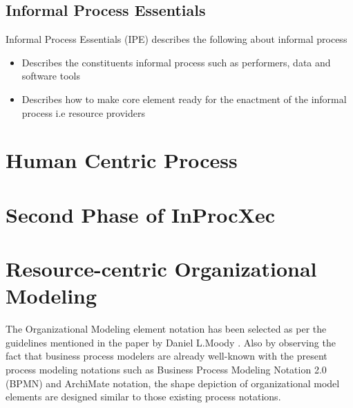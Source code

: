 \subsection{Informal Process Essentials}
\label{sec:informalprocessessentials}
Informal Process Essentials (IPE) describes the following about informal process \cite{Sungur2014} 

\begin{itemize}
	\item Describes the constituents informal process such as performers, data and software tools
	\item Describes how to make core element ready for the enactment of the informal process i.e resource providers
\end{itemize}




\section{Human Centric Process}
\label{sec:humancentric}



\section{Second Phase of InProcXec}
\label{sec:inproxec}





\section{Resource-centric Organizational Modeling}
 The Organizational Modeling element notation has been selected as per the guidelines mentioned in the paper by Daniel L.Moody \cite{Moody2009}. Also by observing  the fact that business process modelers are already well-known with the present process modeling notations such as Business Process Modeling Notation 2.0 (BPMN) \cite{bpm2011} and ArchiMate notation\cite{arc2013}, the shape depiction of organizational model elements are designed similar to those existing process notations. 

